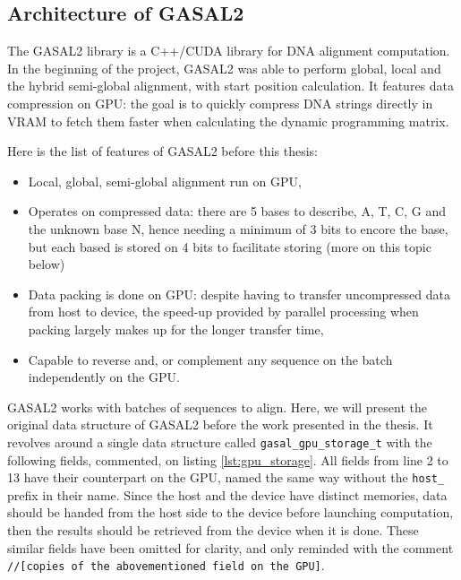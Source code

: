 \subsection{Architecture of GASAL2}
The GASAL2 library is a C++/CUDA library for DNA alignment computation. In the beginning of the project, GASAL2 was able to perform global, local and the hybrid semi-global alignment, with start position calculation. It features data compression on GPU: the goal is to quickly compress DNA strings directly in VRAM to fetch them faster when calculating the dynamic programming matrix.

Here is the list of features of GASAL2 before this thesis:

\begin{itemize}
	\item Local, global, semi-global alignment run on GPU,
	\item Operates on compressed data: there are 5 bases to describe, A, T, C, G and the unknown base N, hence needing a minimum of 3 bits to encore the base, but each based is stored on 4 bits to facilitate storing (more on this topic below)
	\item Data packing is done on GPU: despite having to transfer uncompressed data from host to device, the speed-up provided by parallel processing when packing largely makes up for the longer transfer time,
	\item Capable to reverse and, or complement any sequence on the batch independently on the GPU.
\end{itemize}

GASAL2 works with batches of sequences to align. Here, we will present the original data structure of GASAL2 before the work presented in the thesis. It revolves around a single data structure called \verb|gasal_gpu_storage_t| with the following fields, commented, on listing \ref{lst:gpu_storage}. All fields from line 2 to 13 have their counterpart on the GPU, named the same way without the \verb|host_| prefix in their name. Since the host and the device have distinct memories, data should be handed from the host side to the device before launching computation, then the results should be retrieved from the device when it is done.  
These similar fields have been omitted for clarity, and only reminded with the comment \verb|//[copies of the abovementioned field on the GPU]|.

